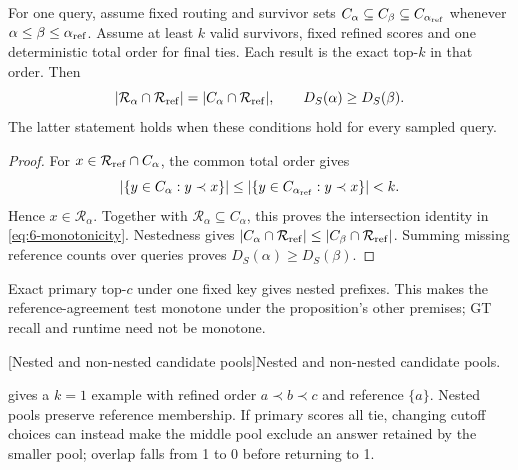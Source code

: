\par\noindent\begin{minipage}{\linewidth}
\begin{proposition}
\label{prop:6-monotonicity}
For one query, assume fixed routing and survivor sets
$C_\alpha\subseteq C_\beta\subseteq C_{\alpha_{\rm ref}}$ whenever
$\alpha\leq\beta\leq\alpha_{\rm ref}$. Assume at least $k$ valid
survivors, fixed refined scores and one deterministic total order for
final ties. Each result is the exact top-$k$ in that order. Then
\begin{equation}
 |\mathcal R_\alpha\cap\mathcal R_{\rm ref}|
 =|C_\alpha\cap\mathcal R_{\rm ref}|,
 \qquad D_S(\alpha)\geq D_S(\beta).
 \label{eq:6-monotonicity}
\end{equation}
The latter statement holds when these conditions hold for every sampled
query.
\end{proposition}
\begin{proof}
For $x\in\mathcal R_{\rm ref}\cap C_\alpha$, the common total order gives
\begin{equation*}
 |\{y\in C_\alpha:y\prec x\}|
 \leq|\{y\in C_{\alpha_{\rm ref}}:y\prec x\}|<k.
\end{equation*}
Hence $x\in\mathcal R_\alpha$. Together with
$\mathcal R_\alpha\subseteq C_\alpha$, this proves the intersection
identity in \cref{eq:6-monotonicity}. Nestedness gives
$|C_\alpha\cap\mathcal R_{\rm ref}|
 \leq|C_\beta\cap\mathcal R_{\rm ref}|$.
Summing missing reference counts over queries proves
$D_S(\alpha)\geq D_S(\beta)$.
\end{proof}
\end{minipage}\par\medskip
Exact primary top-$c$ under one fixed key gives nested prefixes. This
makes the reference-agreement test monotone under the proposition's
other premises; GT recall and runtime need not be monotone.

\par\medskip\noindent\begin{minipage}{\linewidth}
\captionsetup{hypcap=false}
\centering
{}[Nested and non-nested candidate pools]{Nested and non-nested candidate pools.}
\label{tab:6-nesting}

\end{minipage}\par\medskip
{} gives a $k=1$ example with refined order
$a\prec b\prec c$ and reference $\{a\}$. Nested pools preserve reference
membership. If primary scores all tie, changing cutoff choices can
instead make the middle pool exclude an answer retained by the smaller
pool; overlap falls from 1 to 0 before returning to 1.

